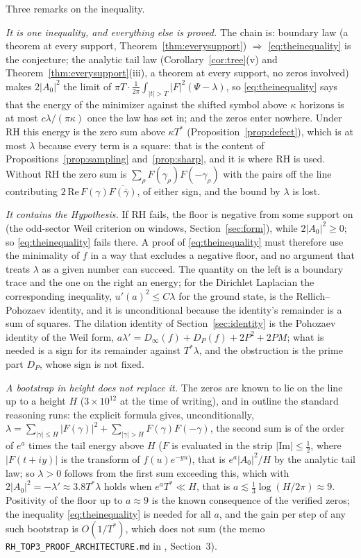 \documentclass[11pt]{article}
\theoremstyle{definition}
\theoremstyle{remark}
\newcommand{\Tst}{T^{*}}
\begin{document}
Three remarks on the inequality.

\emph{It is one inequality, and everything else is proved.} The chain is: boundary law (a theorem at every support, Theorem~\ref{thm:everysupport}) $\Rightarrow$ \eqref{eq:theinequality} is the conjecture; the analytic tail law (Corollary~\ref{cor:tree}(v) and Theorem~\ref{thm:everysupport}(iii), a theorem at every support, no zeros involved) makes $2|A_0|^2$ the limit of $\pi T\cdot\frac1{2\pi}\int_{|t|>T}|F|^2(\Psi-\lambda)$, so \eqref{eq:theinequality} says that the energy of the minimizer against the shifted symbol above $\kappa$ horizons is at most $c\lambda/(\pi\kappa)$ once the law has set in; and the zeros enter nowhere. Under RH this energy is the zero sum above $\kappa\Tst$ (Proposition~\ref{prop:defect}), which is at most $\lambda$ because every term is a square: that is the content of Propositions~\ref{prop:sampling} and~\ref{prop:sharp}, and it is where RH is used. Without RH the zero sum is $\sum_\rho F(\gamma_\rho)F(-\gamma_\rho)$ with the pairs off the line contributing $2\,\mathrm{Re}\,F(\gamma)\overline{F(\bar\gamma)}$, of either sign, and the bound by $\lambda$ is lost.

\emph{It contains the Hypothesis.} If RH fails, the floor is negative from some support on (the odd-sector Weil criterion on windows, Section~\ref{sec:form}), while $2|A_0|^2\ge0$; so \eqref{eq:theinequality} fails there. A proof of \eqref{eq:theinequality} must therefore use the minimality of $f$ in a way that excludes a negative floor, and no argument that treats $\lambda$ as a given number can succeed. The quantity on the left is a boundary trace and the one on the right an energy; for the Dirichlet Laplacian the corresponding inequality, $u'(a)^2\le C\lambda$ for the ground state, is the Rellich--Pohozaev identity, and it is unconditional because the identity's remainder is a sum of squares. The dilation identity of Section~\ref{sec:identity} is the Pohozaev identity of the Weil form, $a\lambda'=D_\infty(f)+D_P(f)+2P^2+2PM$; what is needed is a sign for its remainder against $\Tst\lambda$, and the obstruction is the prime part $D_P$, whose sign is not fixed.

\emph{A bootstrap in height does not replace it.} The zeros are known to lie on the line up to a height $H$ ($3\times10^{12}$ at the time of writing), and in outline the standard reasoning runs: the explicit formula gives, unconditionally, $\lambda=\sum_{|\gamma|\le H}|F(\gamma)|^2+\sum_{|\gamma|>H}F(\gamma)F(-\gamma)$, the second sum is of the order of $e^{a}$ times the tail energy above $H$ ($F$ is evaluated in the strip $|\mathrm{Im}|\le\tfrac12$, where $|F(t+iy)|$ is the transform of $f(u)e^{-yu}$), that is $e^a|A_0|^2/H$ by the analytic tail law; so $\lambda>0$ follows from the first sum exceeding this, which with $2|A_0|^2=-\lambda'\approx3.8\Tst\lambda$ holds when $e^a\Tst\ll H$, that is $a\lesssim\tfrac13\log(H/2\pi)\approx9$. Positivity of the floor up to $a\approx9$ is the known consequence of the verified zeros; the inequality \eqref{eq:theinequality} is needed for all $a$, and the gain per step of any such bootstrap is $O(1/\Tst)$, which does not sum (the memo \texttt{RH\_TOP3\_PROOF\_ARCHITECTURE.md} in \cite{michaels-repo}, Section~3).
\end{document}
